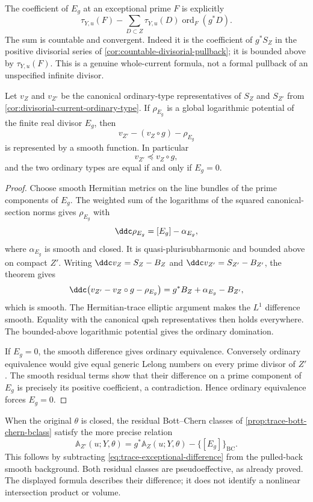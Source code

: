 The coefficient of $E_g$ at an exceptional prime $F$ is explicitly
\begin{equation}\label{eq:trace-exceptional-coefficient}
 \tau_{Y,u}(F)
  -\sum_{D\subset Z}\tau_{Y,u}(D)\operatorname{ord}_F(g^*D).
\end{equation}
The sum is countable and convergent. Indeed it is the coefficient of $g^*S_Z$ in the positive divisorial series of \cref{cor:countable-divisorial-pullback}; it is bounded above by $\tau_{Y,u}(F)$. This is a genuine whole-current formula, not a formal pullback of an unspecified infinite divisor.

\begin{corollary}\label{cor:trace-model-ordinary-comparison}
Let $v_Z$ and $v_{Z'}$ be the canonical ordinary-type representatives of $S_Z$ and $S_{Z'}$ from \cref{cor:divisorial-current-ordinary-type}. If $\rho_{E_g}$ is a global logarithmic potential of the finite real divisor $E_g$, then
\[
 v_{Z'}-(v_Z\circ g)-\rho_{E_g}
\]
is represented by a smooth function. In particular
\[
 v_{Z'}\preceq v_Z\circ g,
\]
and the two ordinary types are equal if and only if $E_g=0$.
\end{corollary}
\begin{proof}
Choose smooth Hermitian metrics on the line bundles of the prime components of $E_g$. The weighted sum of the logarithms of the squared canonical-section norms gives $\rho_{E_g}$ with
\[
 \ddc\rho_{E_g}=[E_g]-\alpha_{E_g},
\]
where $\alpha_{E_g}$ is smooth and closed. It is quasi-plurisubharmonic and bounded above on compact $Z'$. Writing $\ddc v_Z=S_Z-B_Z$ and $\ddc v_{Z'}=S_{Z'}-B_{Z'}$, the theorem gives
\[
 \ddc\bigl(v_{Z'}-v_Z\circ g-\rho_{E_g}\bigr)
       =g^*B_Z+\alpha_{E_g}-B_{Z'},
\]
which is smooth. The Hermitian-trace elliptic argument makes the $L^1$ difference smooth. Equality with the canonical qpsh representatives then holds everywhere. The bounded-above logarithmic potential gives the ordinary domination.

If $E_g=0$, the smooth difference gives ordinary equivalence. Conversely ordinary equivalence would give equal generic Lelong numbers on every prime divisor of $Z'$. The smooth residual terms show that their difference on a prime component of $E_g$ is precisely its positive coefficient, a contradiction. Hence ordinary equivalence forces $E_g=0$.
\end{proof}

When the original $\theta$ is closed, the residual Bott--Chern classes of \cref{prop:trace-bott-chern-bclass} satisfy the more precise relation
\[
 \mathbb A_{Z'}(u;Y,\theta)
       =g^*\mathbb A_Z(u;Y,\theta)-\{[E_g]\}_{\mathrm{BC}}.
\]
This follows by subtracting \eqref{eq:trace-exceptional-difference} from the pulled-back smooth background. Both residual classes are pseudoeffective, as already proved. The displayed formula describes their difference; it does not identify a nonlinear intersection product or volume.

